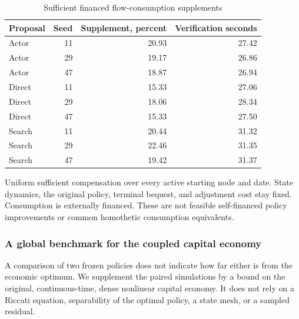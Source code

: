 \documentclass[ecta,nameyear,draft]{econsocart}
\theoremstyle{definition}
\theoremstyle{remark}
\begin{document}
\begin{table}[htbp]
\centering\small\setlength{\tabcolsep}{4pt}
\caption{Sufficient financed flow-consumption supplements}\label{tab:r9welfare}
\begin{tabular}{lrrr}
\toprule
Proposal & Seed & Supplement, percent & Verification seconds \\
\midrule
Actor & 11 & 20.93 & 27.42 \\
Actor & 29 & 19.17 & 26.86 \\
Actor & 47 & 18.87 & 26.94 \\
Direct & 11 & 15.33 & 27.06 \\
Direct & 29 & 18.06 & 28.34 \\
Direct & 47 & 15.33 & 27.50 \\
Search & 11 & 20.44 & 31.32 \\
Search & 29 & 22.46 & 31.35 \\
Search & 47 & 19.42 & 31.37 \\
\bottomrule
\end{tabular}
\par\vspace{3pt}\begin{minipage}{0.97\linewidth}\footnotesize Uniform sufficient compensation over every active starting node and date. State dynamics, the original policy, terminal bequest, and adjustment cost stay fixed. Consumption is externally financed. These are not feasible self-financed policy improvements or common homothetic consumption equivalents.\end{minipage}
\end{table}



\subsubsection{A global benchmark for the coupled capital economy}\label{sec:r9capital}
A comparison of two frozen policies does not indicate how far either is from the economic optimum. We supplement the paired simulations by a bound on the original, continuous-time, dense nonlinear capital economy. It does not rely on a Riccati equation, separability of the optimal policy, a state mesh, or a sampled residual.
\end{document}
